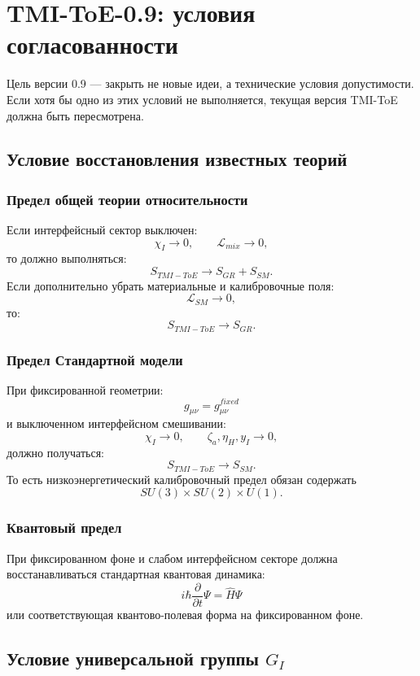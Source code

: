 \documentclass[12pt,a4paper]{article}
\begin{document}
\section{TMI-ToE-0.9: условия согласованности}

Цель версии 0.9 — закрыть не новые идеи, а технические условия допустимости. Если хотя бы одно из этих условий не выполняется, текущая версия TMI-ToE должна быть пересмотрена.

\subsection{Условие восстановления известных теорий}

\subsubsection*{Предел общей теории относительности}

Если интерфейсный сектор выключен:
\[
\chi_I\to0,\qquad \mathcal L_{mix}\to0,
\]
то должно выполняться:
\[
\boxed{S_{TMI-ToE}\to S_{GR}+S_{SM}}.
\]
Если дополнительно убрать материальные и калибровочные поля:
\[
\mathcal L_{SM}\to0,
\]
то:
\[
\boxed{S_{TMI-ToE}\to S_{GR}}.
\]

\subsubsection*{Предел Стандартной модели}

При фиксированной геометрии:
\[
g_{\mu\nu}=g_{\mu\nu}^{fixed}
\]
и выключенном интерфейсном смешивании:
\[
\chi_I\to0,\qquad \zeta_a,\eta_H,y_I\to0,
\]
должно получаться:
\[
\boxed{S_{TMI-ToE}\to S_{SM}}.
\]
То есть низкоэнергетический калибровочный предел обязан содержать
\[
\boxed{SU(3)\times SU(2)\times U(1)}.
\]

\subsubsection*{Квантовый предел}

При фиксированном фоне и слабом интерфейсном секторе должна восстанавливаться стандартная квантовая динамика:
\[
\boxed{i\hbar\frac{\partial}{\partial t}\Psi=\widehat H\Psi}
\]
или соответствующая квантово-полевая форма на фиксированном фоне.

\subsection{Условие универсальной группы $G_I$}
\end{document}
